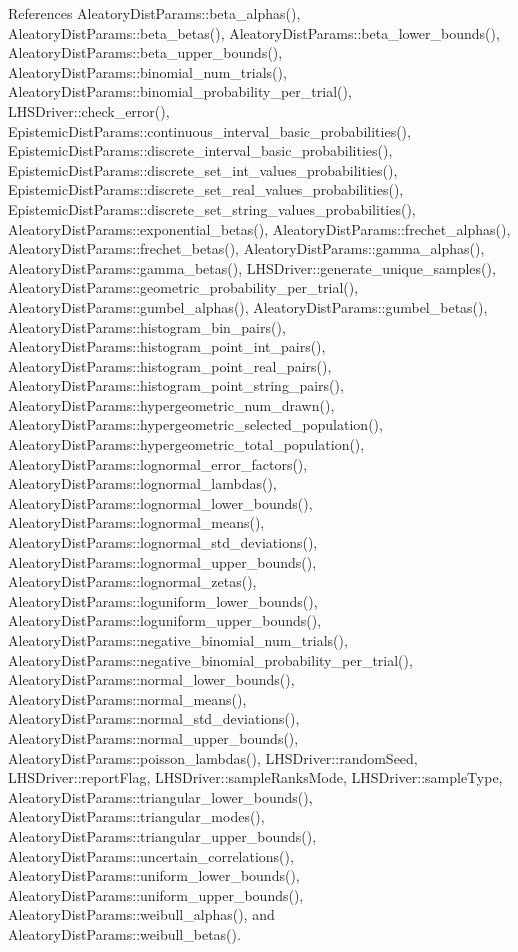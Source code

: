 References Aleatory\+Dist\+Params\+::beta\+\_\+alphas(), Aleatory\+Dist\+Params\+::beta\+\_\+betas(), Aleatory\+Dist\+Params\+::beta\+\_\+lower\+\_\+bounds(), Aleatory\+Dist\+Params\+::beta\+\_\+upper\+\_\+bounds(), Aleatory\+Dist\+Params\+::binomial\+\_\+num\+\_\+trials(), Aleatory\+Dist\+Params\+::binomial\+\_\+probability\+\_\+per\+\_\+trial(), L\+H\+S\+Driver\+::check\+\_\+error(), Epistemic\+Dist\+Params\+::continuous\+\_\+interval\+\_\+basic\+\_\+probabilities(), Epistemic\+Dist\+Params\+::discrete\+\_\+interval\+\_\+basic\+\_\+probabilities(), Epistemic\+Dist\+Params\+::discrete\+\_\+set\+\_\+int\+\_\+values\+\_\+probabilities(), Epistemic\+Dist\+Params\+::discrete\+\_\+set\+\_\+real\+\_\+values\+\_\+probabilities(), Epistemic\+Dist\+Params\+::discrete\+\_\+set\+\_\+string\+\_\+values\+\_\+probabilities(), Aleatory\+Dist\+Params\+::exponential\+\_\+betas(), Aleatory\+Dist\+Params\+::frechet\+\_\+alphas(), Aleatory\+Dist\+Params\+::frechet\+\_\+betas(), Aleatory\+Dist\+Params\+::gamma\+\_\+alphas(), Aleatory\+Dist\+Params\+::gamma\+\_\+betas(), L\+H\+S\+Driver\+::generate\+\_\+unique\+\_\+samples(), Aleatory\+Dist\+Params\+::geometric\+\_\+probability\+\_\+per\+\_\+trial(), Aleatory\+Dist\+Params\+::gumbel\+\_\+alphas(), Aleatory\+Dist\+Params\+::gumbel\+\_\+betas(), Aleatory\+Dist\+Params\+::histogram\+\_\+bin\+\_\+pairs(), Aleatory\+Dist\+Params\+::histogram\+\_\+point\+\_\+int\+\_\+pairs(), Aleatory\+Dist\+Params\+::histogram\+\_\+point\+\_\+real\+\_\+pairs(), Aleatory\+Dist\+Params\+::histogram\+\_\+point\+\_\+string\+\_\+pairs(), Aleatory\+Dist\+Params\+::hypergeometric\+\_\+num\+\_\+drawn(), Aleatory\+Dist\+Params\+::hypergeometric\+\_\+selected\+\_\+population(), Aleatory\+Dist\+Params\+::hypergeometric\+\_\+total\+\_\+population(), Aleatory\+Dist\+Params\+::lognormal\+\_\+error\+\_\+factors(), Aleatory\+Dist\+Params\+::lognormal\+\_\+lambdas(), Aleatory\+Dist\+Params\+::lognormal\+\_\+lower\+\_\+bounds(), Aleatory\+Dist\+Params\+::lognormal\+\_\+means(), Aleatory\+Dist\+Params\+::lognormal\+\_\+std\+\_\+deviations(), Aleatory\+Dist\+Params\+::lognormal\+\_\+upper\+\_\+bounds(), Aleatory\+Dist\+Params\+::lognormal\+\_\+zetas(), Aleatory\+Dist\+Params\+::loguniform\+\_\+lower\+\_\+bounds(), Aleatory\+Dist\+Params\+::loguniform\+\_\+upper\+\_\+bounds(), Aleatory\+Dist\+Params\+::negative\+\_\+binomial\+\_\+num\+\_\+trials(), Aleatory\+Dist\+Params\+::negative\+\_\+binomial\+\_\+probability\+\_\+per\+\_\+trial(), Aleatory\+Dist\+Params\+::normal\+\_\+lower\+\_\+bounds(), Aleatory\+Dist\+Params\+::normal\+\_\+means(), Aleatory\+Dist\+Params\+::normal\+\_\+std\+\_\+deviations(), Aleatory\+Dist\+Params\+::normal\+\_\+upper\+\_\+bounds(), Aleatory\+Dist\+Params\+::poisson\+\_\+lambdas(), L\+H\+S\+Driver\+::random\+Seed, L\+H\+S\+Driver\+::report\+Flag, L\+H\+S\+Driver\+::sample\+Ranks\+Mode, L\+H\+S\+Driver\+::sample\+Type, Aleatory\+Dist\+Params\+::triangular\+\_\+lower\+\_\+bounds(), Aleatory\+Dist\+Params\+::triangular\+\_\+modes(), Aleatory\+Dist\+Params\+::triangular\+\_\+upper\+\_\+bounds(), Aleatory\+Dist\+Params\+::uncertain\+\_\+correlations(), Aleatory\+Dist\+Params\+::uniform\+\_\+lower\+\_\+bounds(), Aleatory\+Dist\+Params\+::uniform\+\_\+upper\+\_\+bounds(), Aleatory\+Dist\+Params\+::weibull\+\_\+alphas(), and Aleatory\+Dist\+Params\+::weibull\+\_\+betas().
